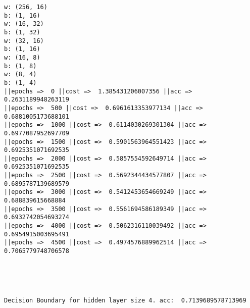 \documentclass[11pt]{article}
\begin{document}
    \begin{Verbatim}[commandchars=\\\{\}]
w: (256, 16)
b: (1, 16)
w: (16, 32)
b: (1, 32)
w: (32, 16)
b: (1, 16)
w: (16, 8)
b: (1, 8)
w: (8, 4)
b: (1, 4)
||epochs =>  0 ||cost =>  1.385431206007356 ||acc =>  0.2631189948263119
||epochs =>  500 ||cost =>  0.6961613353977134 ||acc =>  0.6881005173688101
||epochs =>  1000 ||cost =>  0.6114030269301304 ||acc =>  0.6977087952697709
||epochs =>  1500 ||cost =>  0.5901563964551423 ||acc =>  0.6925351071692535
||epochs =>  2000 ||cost =>  0.5857554592649714 ||acc =>  0.6925351071692535
||epochs =>  2500 ||cost =>  0.5692344434577807 ||acc =>  0.6895787139689579
||epochs =>  3000 ||cost =>  0.5412453654669249 ||acc =>  0.688839615668884
||epochs =>  3500 ||cost =>  0.5561694586189349 ||acc =>  0.6932742054693274
||epochs =>  4000 ||cost =>  0.5062316110039492 ||acc =>  0.6954915003695491
||epochs =>  4500 ||cost =>  0.4974576889962514 ||acc =>  0.7065779748706578

    \end{Verbatim}

    \begin{center}
    \end{center}
    { \hspace*{\fill} \\}
    
    \begin{center}
    \end{center}
    { \hspace*{\fill} \\}
    
    \begin{Verbatim}[commandchars=\\\{\}]
Decision Boundary for hidden layer size 4. acc:  0.7139689578713969

    \end{Verbatim}
\end{document}

